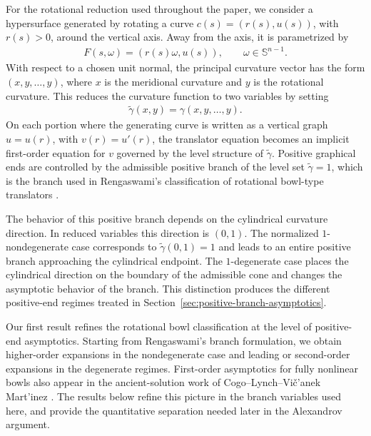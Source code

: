 \documentclass{amsart}
\theoremstyle{plain}
\theoremstyle{mainintrothm}
\theoremstyle{definition}
\begin{document}
\medskip

For the rotational reduction used throughout the paper, we consider a
hypersurface generated by rotating a curve $c(s)=(r(s),u(s))$, with $r(s)>0$,
around the vertical axis.  Away from the axis, it is parametrized by
\begin{align*}
	F(s,\omega)=(r(s)\omega,u(s)),
	\qquad
	\omega\in\mathbb S^{n-1}.
\end{align*}
With respect to a chosen unit normal, the principal curvature vector has the
form $(x,y,\ldots,y)$, where $x$ is the meridional curvature and $y$ is the
rotational curvature.  This reduces the curvature function to two variables by
setting
\begin{align*}
	\widetilde\gamma(x,y)=\gamma(x,y,\ldots,y).
\end{align*}
On each portion where the generating curve is written as a vertical graph
$u=u(r)$, with $v(r)=u'(r)$, the translator equation becomes an implicit
first-order equation for $v$ governed by the level structure of
$\widetilde\gamma$.  Positive graphical ends are controlled by the admissible
positive branch of the level set $\widetilde\gamma=1$, which is the branch used
in Rengaswami's classification of rotational bowl-type translators
\cite{rengaswami2024classification}.

\medskip

The behavior of this positive branch depends on the cylindrical curvature
direction.  In reduced variables this direction is $(0,1)$.  The normalized
$1$-nondegenerate case corresponds to $\widetilde\gamma(0,1)=1$ and leads to an
entire positive branch approaching the cylindrical endpoint.  The
$1$-degenerate case places the cylindrical direction on the boundary of the
admissible cone and changes the asymptotic behavior of the branch.  This
distinction produces the different positive-end regimes treated in
Section~\ref{sec:positive-branch-asymptotics}.

\medskip

Our first result refines the rotational bowl classification at the level of
positive-end asymptotics.  Starting from Rengaswami's branch formulation, we
obtain higher-order expansions in the nondegenerate case and leading or
second-order expansions in the degenerate regimes.  First-order asymptotics for
fully nonlinear bowls also appear in the ancient-solution work of
Cogo--Lynch--Vi\v{c}'anek Mart'inez
\cite[Appendix~A, Proposition~A.1]{cogo-lynch-vicanek2023rotational}.  The
results below refine this picture in the branch variables used here, and provide
the quantitative separation needed later in the Alexandrov argument.
\end{document}
